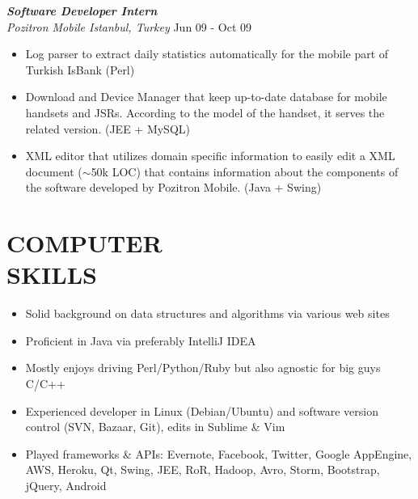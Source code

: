 \documentclass[line, margin]{res}
\begin{document}
\begin{resume}
				{\sl \textbf{Software Developer Intern} \\ Pozitron Mobile Istanbul, Turkey} \hfill Jun 09 - Oct 09\\
				\vspace{-0.3cm}
				\begin{itemize} \itemsep -2pt
					\item Log parser to extract daily statistics automatically for the mobile part of Turkish IsBank (Perl)
					\item Download and Device Manager that keep up-to-date database for mobile handsets  and JSRs. According to the model of the handset, it serves the related version. (JEE + MySQL)
					\item XML editor that utilizes domain specific information to easily edit a XML document ($\sim$50k LOC) that contains information about the components of the software developed by Pozitron Mobile. (Java + Swing)
				\end{itemize}

\section{COMPUTER \\ SKILLS} 
				\begin{itemize}
				\item Solid background on data structures and algorithms via various web sites
				\item Proficient in Java via preferably IntelliJ IDEA
				\item Mostly enjoys driving Perl/Python/Ruby but also agnostic for big guys C/C++
				\item Experienced developer in Linux (Debian/Ubuntu) and software version control (SVN, Bazaar, Git), edits in Sublime \& Vim
				\item Played frameworks \& APIs: Evernote, Facebook, Twitter, Google AppEngine, AWS, Heroku, Qt, Swing, JEE, RoR, Hadoop, Avro, Storm, Bootstrap, jQuery, Android
				\end{itemize}

\end{resume}
\end{document}
